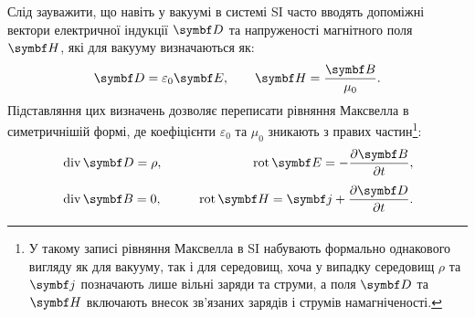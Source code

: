 Слід зауважити, що навіть у вакуумі в системі SI часто вводять допоміжні вектори електричної індукції \(\Dfield\) та напруженості магнітного поля \(\Hfield\), які для вакууму визначаються як:
\begin{equation*}
	\Dfield = \varepsilon_0 \Efield, \qquad \Hfield = \frac{\Bfield}{\mu_0}.
\end{equation*}
Підставляння цих визначень дозволяє переписати рівняння Максвелла в симетричнішій формі, де коефіцієнти \(\varepsilon_0\) та \(\mu_0\) зникають з правих частин\footnote{У такому записі рівняння Максвелла в SI набувають формально однакового вигляду як для вакууму, так і для середовищ, хоча у випадку середовищ \(\rho\) та \(\vect{j}\) позначають лише вільні заряди та струми, а поля \(\Dfield\) та \(\Hfield\) включають внесок зв'язаних зарядів і струмів намагніченості.}:
\begin{equation*}
	\begin{aligned}
		 & \Div\Dfield = \rho, \qquad
		 & \Rot\Efield = -\frac{\partial \Bfield}{\partial t},           \\[4pt]
		 & \Div\Bfield = 0, \qquad
		 & \Rot\Hfield = \vect{j} + \frac{\partial \Dfield}{\partial t}.
	\end{aligned}
\end{equation*}
